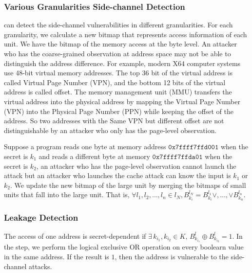 \subsubsection{Various Granularities Side-channel Detection}
\ctool{} can detect the side-channel vulnerabilities in different granularities. For each granularity, we calculate a new bitmap that represents access information of each unit. We have the bitmap of the memory access at the byte level. An attacker who has the coarse-grained observation at address space may not be able to distinguish the address difference. For example, modern X64 computer systems use 48-bit virtual memory addresses. The top 36 bit of the virtual address is called Virtual Page Number (VPN), and the bottom 12 bits of the virtual address is called offset. The memory management unit (MMU) transfers the virtual address into the physical address by mapping the Virtual Page Number (VPN) into the Physical Page Number (PPN) while keeping the offset of the address. So two addresses with the Same VPN but different offset are not distinguishable by an attacker who only has the page-level observation. 

Suppose a program reads one byte at memory address
$\mathtt{0x7ffff7ffd001}$ when the secret is $k_1$ and reads a
different byte at memory $\mathtt{0x7ffff7ffda01}$ when the secret is
$k_2$, an attacker who has the page-level observation cannot launch
the attack but an attacker who launches the cache attack can know the
input is $k_1$ or $k_2$. We update the new bitmap of the large unit by
merging the bitmaps of small units that fall into the large unit. That
is, $\forall
  l_1, l_2, \dots, l_n \in l_N, B^{l_N}_{k_i} = B^{l_1}_{k_i} \lor,\dots,\lor B^{l_n}_{k_n}$.


\subsubsection{Leakage Detection} 
The access of one address is secret-dependent if $ \exists\, k_{i_1}, k_{i_2} \in K, \, B^{l}_{k_{i_1}} \oplus  B^{l}_{k_{i_2}} =1 $. In the step, we perform the logical exclusive OR operation on every boolearn value in the same address. If the result is $1$, then the address is vulnerable to the side-channel attacks.

